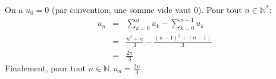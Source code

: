On a $u_0=0$ (par convention, une somme vide vaut 0). Pour tout $n\in\mathbb{N}^*$:
\begin{eqnarray}
  u_n &=& \sum_{k=0}^n{u_k} - \sum_{k=0}^{n-1}{u_k} \nonumber \\ 
                      &=& \frac{n^2 + n}{3}- \frac{(n-1)^2 + (n-1)}{3}\nonumber \\ 
                      &=& \frac{2n}{3} \nonumber
\end{eqnarray}
Finalement, pour tout $n\in\mathbb{N}, u_n=\frac{2n}{3}$.
